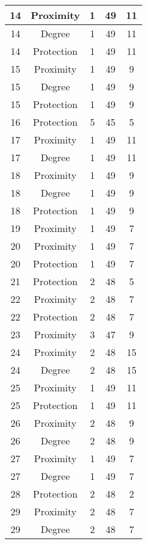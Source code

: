\documentclass[results.tex]{subfiles}
\begin{document}
\begin{center}
\begin{tabular}{| c || c | c | c | c |}
    \hline
    14 & Proximity & 1 & 49 & 11 \\ 
    \hline
    14 & Degree & 1 & 49 & 11 \\ 
    \hline
    14 & Protection & 1 & 49 & 11 \\ 
    \hline
    15 & Proximity & 1 & 49 & 9 \\ 
    \hline
    15 & Degree & 1 & 49 & 9 \\ 
    \hline
    15 & Protection & 1 & 49 & 9 \\ 
    \hline
    16 & Protection & 5 & 45 & 5 \\ 
    \hline
    17 & Proximity & 1 & 49 & 11 \\ 
    \hline
    17 & Degree & 1 & 49 & 11 \\ 
    \hline
    18 & Proximity & 1 & 49 & 9 \\ 
    \hline
    18 & Degree & 1 & 49 & 9 \\ 
    \hline
    18 & Protection & 1 & 49 & 9 \\ 
    \hline
    19 & Proximity & 1 & 49 & 7 \\ 
    \hline
    20 & Proximity & 1 & 49 & 7 \\ 
    \hline
    20 & Protection & 1 & 49 & 7 \\ 
    \hline
    21 & Protection & 2 & 48 & 5 \\ 
    \hline
    22 & Proximity & 2 & 48 & 7 \\ 
    \hline
    22 & Protection & 2 & 48 & 7 \\ 
    \hline
    23 & Proximity & 3 & 47 & 9 \\ 
    \hline
    24 & Proximity & 2 & 48 & 15 \\ 
    \hline
    24 & Degree & 2 & 48 & 15 \\ 
    \hline
    25 & Proximity & 1 & 49 & 11 \\ 
    \hline
    25 & Protection & 1 & 49 & 11 \\ 
    \hline
    26 & Proximity & 2 & 48 & 9 \\ 
    \hline
    26 & Degree & 2 & 48 & 9 \\ 
    \hline
    27 & Proximity & 1 & 49 & 7 \\ 
    \hline
    27 & Degree & 1 & 49 & 7 \\ 
    \hline
    28 & Protection & 2 & 48 & 2 \\ 
    \hline
    29 & Proximity & 2 & 48 & 7 \\ 
    \hline
    29 & Degree & 2 & 48 & 7 \\ 

\end{tabular}
\end{center}
\end{document}
